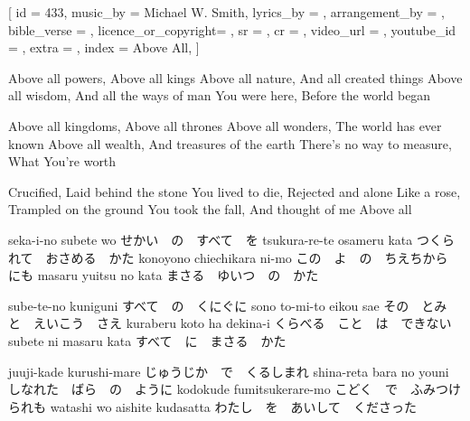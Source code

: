 [
    id                  = {433},
    music_by            = {Michael W. Smith}, %
    lyrics_by           = {}, %
    arrangement_by      = {}, %
    bible_verse         = {},
    licence_or_copyright= {},
    sr                  = {},
    cr                  = {},
    video_url           = {}, %
    youtube_id          = {}, %
    extra               = {},
    index               = {Above All},
]

\beginverse
Above all powers, Above all kings
Above all nature, And all created things
Above all wisdom, And all the ways of man
You were here, Before the world began
\endverse

\beginverse
Above all kingdoms, Above all thrones
Above all wonders, The world has ever known
Above all wealth, And treasures of the earth
There’s no way to measure, What You’re worth
\endverse

\beginchorus
Crucified, Laid behind the stone
You lived to die, Rejected and alone
Like a rose, Trampled on the ground
You took the fall, And thought of me
Above all
\endchorus

\beginverse
seka-i-no subete wo せかい　の　すべて　を
tsukura-re-te osameru kata つくられて　おさめる　かた
konoyono chiechikara ni-mo この　よ　の　ちえちから　にも
masaru yuitsu no kata まさる　ゆいつ　の　かた
\endverse

\beginverse
sube-te-no kuniguni すべて　の　くにぐに
sono to-mi-to eikou sae その　とみ　と　えいこう　さえ
kuraberu koto ha dekina-i くらべる　こと　は　できない
subete ni masaru kata すべて　に　まさる　かた
\endverse

\beginchorus
juuji-kade kurushi-mare じゅうじか　で　くるしまれ
shina-reta bara no youni しなれた　ばら　の　ように
kodokude fumitsukerare-mo こどく　で　ふみつけられも
watashi wo aishite kudasatta わたし　を　あいして　くださった
\endchorus

\endsong
